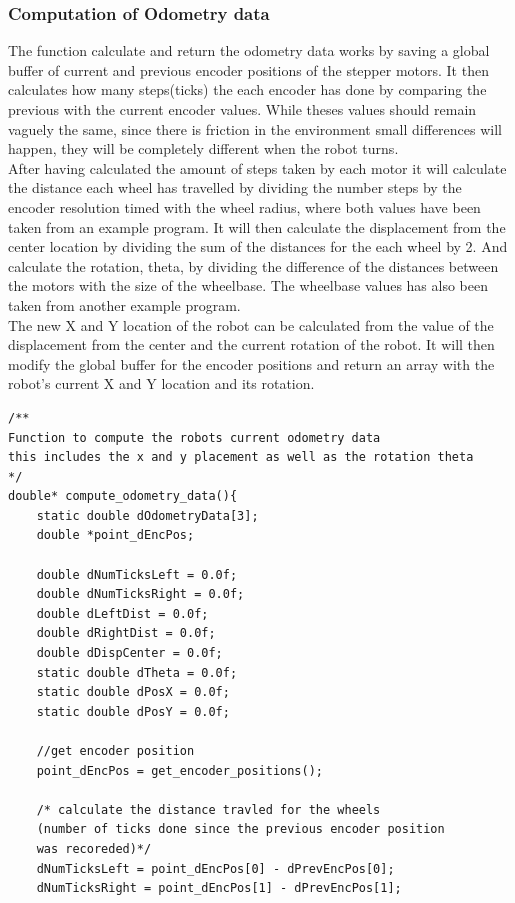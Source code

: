 \documentclass[10pt,a4paper]{article}
\begin{document}
\begin{flushleft}
\subsubsection{Computation of Odometry data} 
The function calculate and return the odometry data works by saving a global buffer of current and previous encoder positions of the stepper motors.
It then calculates how many steps(ticks) the each encoder has done by comparing the previous with the current encoder values. While theses values should remain vaguely the same, since there is friction in the environment small differences will happen, they will be completely different 
when the robot turns. \\
After having calculated the amount of steps taken by each motor it will calculate the distance each wheel has travelled by dividing the number steps by the encoder resolution timed with the wheel radius, where both values have been taken from an example program.
It will then calculate the displacement from the center location by dividing the sum of the distances for the each wheel by 2. And calculate the rotation, theta, by dividing the difference of the distances between the motors with the size of the wheelbase. The wheelbase values has also been taken from another example program.\\
The new X and Y location of the robot can be calculated from the value of the displacement from the center and the current rotation of the robot. 
It will then modify the global buffer for the encoder positions and return an array with the robot's current X and Y location and its rotation.\\
\begin{lstlisting}
/**
Function to compute the robots current odometry data
this includes the x and y placement as well as the rotation theta
*/
double* compute_odometry_data(){
	static double dOdometryData[3];
	double *point_dEncPos;
	
	double dNumTicksLeft = 0.0f;
	double dNumTicksRight = 0.0f;
	double dLeftDist = 0.0f;
	double dRightDist = 0.0f;
	double dDispCenter = 0.0f;
	static double dTheta = 0.0f;
	static double dPosX = 0.0f;
	static double dPosY = 0.0f;
	
	//get encoder position
	point_dEncPos = get_encoder_positions();
	
	/* calculate the distance travled for the wheels
	(number of ticks done since the previous encoder position
	was recoreded)*/
	dNumTicksLeft = point_dEncPos[0] - dPrevEncPos[0];
	dNumTicksRight = point_dEncPos[1] - dPrevEncPos[1];
	

\end{lstlisting}
\end{flushleft}
\end{document}
